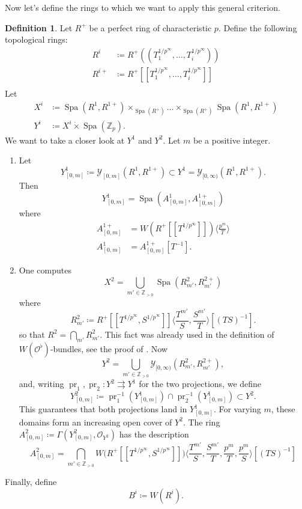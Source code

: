 \documentclass[10pt,twoside]{article}
\numberwithin{equation}{section}
\theoremstyle{plain}
\theoremstyle{definition}
\newtheorem{mydef}[mythm]{Definition}
\DeclareMathOperator{\Spa}{Spa}
\newcommand{\ZZ}{\mathbb{Z}}
\newcommand{\MCO}{\mathcal{O}}
\newcommand{\MCY}{\mathcal{Y}}
\newcommand{\pRoots}{{1/p^\infty}}
\newcommand{\ZZgz}{\ZZ_{> 0}}
\renewcommand{\Langle}{\Big\langle}
\renewcommand{\Rangle}{\Big\rangle}
\newcommand{\Yco}{\MCY_{[0,\infty)}}
\begin{document}
Now let's define the rings to which we want to apply this general criterion.
\begin{mydef}\label{caseIDefinition}
Let \(R^+\) be a perfect ring of characteristic \(p\). Define the following topological rings:
\begin{align*}
    R^{i}&\coloneqq R^+((T_1^{\pRoots},\dots,T_i^{\pRoots}))\\
    R^{i+}&\coloneqq R^+[[T_1^{\pRoots},\dots,T_i^{\pRoots}]]\\
\end{align*}
Let 
\begin{align*}
X^i&\coloneqq\Spa(R^1,R^{1+})\times_{\Spa(R^+)}\dots\times_{\Spa(R^+)}\Spa(R^1,R^{1+})\\
Y^i&\coloneqq X^i\dot \times \Spa(\ZZ_p).
\end{align*}
We want to take a closer look at \(Y^1\) and \(Y^2\). Let \(m\) be a positive integer.
\begin{enumerate}
    \item Let
    \[Y^1_{[0,m]}\coloneqq \MCY_{[0,m]}(R^1,R^{1+})\subset Y^1=\Yco(R^1,R^{1+}).\]
    Then 
    \[Y^1_{[0,m]}=\Spa(A^1_{[0,m]}, A^{1+}_{[0,m]})\]
    where
    \begin{align*}
        A^{1+}_{[0,m]}
    &= W(R^+[[T^{\pRoots}]])\Langle\frac {p^m} T\Rangle\\
    A^1_{[0,m]}&=A_{[0,m]}^{1+}[T^{-1}].
    \end{align*}

    \item One computes
        \[X^2=\bigcup_{m'\in \ZZ_{>0}}\Spa(R_{m'}^2, R_{m'}^{2+})\]
        where
        \[R_{m'}^2\coloneqq R^+[[T^{\pRoots},S^{\pRoots}]]\Langle\frac{T^{m'}}S,\frac{S^{m'}}{T}\Rangle [(TS)^{-1}].\]
        so that \(R^2=\bigcap_{m'} R^2_{m'}\). This fact was already used in the definition of \(W(\MCO^\flat)\)-bundles, see the proof of \cite[Lemma 5.2]{Kim}. Now
        \[Y^2=\bigcup_{m'\in \ZZgz} \Yco(R^2_{m'}, R^{2+}_{m'}),\]
        and, writing \(\operatorname{pr}_1,\operatorname{pr}_2\colon Y^2\rightrightarrows Y^1\) for the two projections, we define
    \[
    Y^2_{[0,m]}\coloneqq \operatorname{pr}_1^{-1}(Y^1_{[0,m]})\cap\operatorname{pr}_2^{-1}(Y^1_{[0,m]})\subset Y^2.
    \]
    This guarantees that both projections land in \(Y^1_{[0,m]}\). For varying \(m\), these domains form an increasing open cover of \(Y^2\).
    The ring \(A^2_{[0,m]}\coloneqq\Gamma(Y^2_{[0,m]},\MCO_{Y^2})\) has the description
    \[A^2_{[0,m]}
    =\bigcap_{m'\in \ZZgz} 
    W\Big(R^+[[T^{\pRoots},S^{\pRoots}]]\Big)
    \Langle\frac{T^{m'}}S,\frac{S^{m'}}{T},\frac {p^{m}}{T},\frac {p^{m}}{S}\Rangle
    [(TS)^{-1}]\]
\end{enumerate}
Finally, define
\[B^i\coloneqq W(R^i).\]
\end{mydef}
\end{document}
